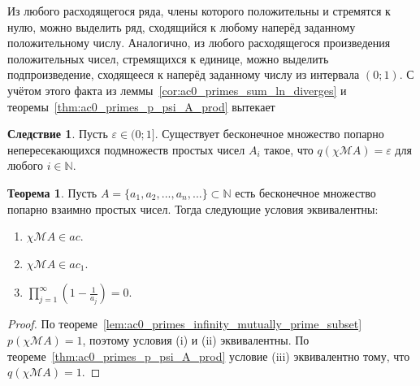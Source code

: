 \documentclass[a4paper,openbib]{article}
\theoremstyle{definition}
\newtheorem{theorem}[lemma]{Теорема}
\newtheorem{corollary}[lemma]{Следствие}
\begin{document}
Из любого расходящегося ряда, члены которого положительны и стремятся к нулю,
можно выделить ряд, сходящийся к любому наперёд заданному положительному числу.
Аналогично, из любого расходящегося произведения положительных чисел, стремящихся к единице, можно выделить
подпроизведение, сходящееся к наперёд заданному числу из интервала $(0;1)$.
С учётом этого факта
из леммы~\ref{cor:ac0_primes_sum_ln_diverges} и теоремы~\ref{thm:ac0_primes_p_psi_A_prod} вытекает
\begin{corollary}
	Пусть $\varepsilon \in  (0; 1{]}$.
	Существует бесконечное множество попарно непересекающихся подмножеств простых чисел
	$A_i$ такое, что $q(\chi\mathscr{M}A)=\varepsilon$ для любого $i\in\mathbb{N}$.
\end{corollary}

%

\begin{theorem}
	Пусть $A=\{a_1, a_2, ..., a_n, ...\}\subset\mathbb{N}$ есть бесконечное множество попарно взаимно простых чисел.
	Тогда следующие условия эквивалентны:
	\begin{enumerate}[label=(\roman*)]
		\item
			$\chi\mathscr{M}A\in ac$.
		\item
			$\chi\mathscr{M}A\in ac_1$.
		\item
			$\prod_{j=1}^\infty \left(1-\frac{1}{a_j}\right) = 0$.
	\end{enumerate}
\end{theorem}

\begin{proof}
	По теореме~\ref{lem:ac0_primes_infinity_mutually_prime_subset} $p(\chi\mathscr{M}A)=1$,
	поэтому условия (i) и (ii) эквивалентны.
	По теореме~\ref{thm:ac0_primes_p_psi_A_prod} условие (iii) эквивалентно тому, что $q(\chi\mathscr{M}A)=1$.
\end{proof}
\end{document}
